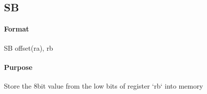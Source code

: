 \subsection{SB}


\paragraph{Format} SB offset(ra), rb

\paragraph{Purpose} Store the 8bit value from the low bits of register `rb` into memory